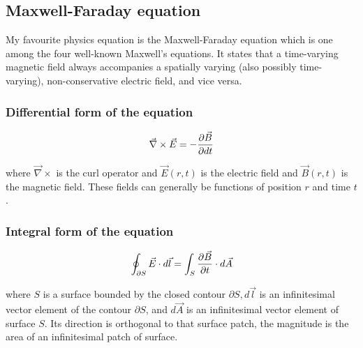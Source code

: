 \subsection{Maxwell-Faraday equation}
My favourite physics equation is the Maxwell-Faraday equation which is one among the four well-known Maxwell's equations. It states that a time-varying magnetic field always accompanies a spatially varying (also possibly time-varying), non-conservative electric field, and vice versa.

\subsubsection{Differential form of the equation}

$$ \vec{\nabla} \times \vec{E} = -{\partial \vec{B} \over \partial dt} $$


where $ \vec{\nabla} \times $ is the curl operator and $ \vec{E}(r, t) $ is the electric field and $ \vec{B}(r, t) $ is the magnetic field. These fields can generally be functions of position $ r $ and time $ t $. 

\subsubsection{Integral form of the equation}

$$ \oint_{\partial S} {\vec{E} \cdot d \vec{l}} = \int_{S} {{\partial \vec{B} \over \partial t} \cdot d \vec{A}} $$


where $ S $ is a surface bounded by the closed contour $ \partial S , d \vec{l} $ is an infinitesimal vector element of the contour $ \partial S $, and $ d \vec{A} $ is an infinitesimal vector element of surface $ S $. Its direction is orthogonal to that surface patch, the magnitude is the area of an infinitesimal patch of surface.
